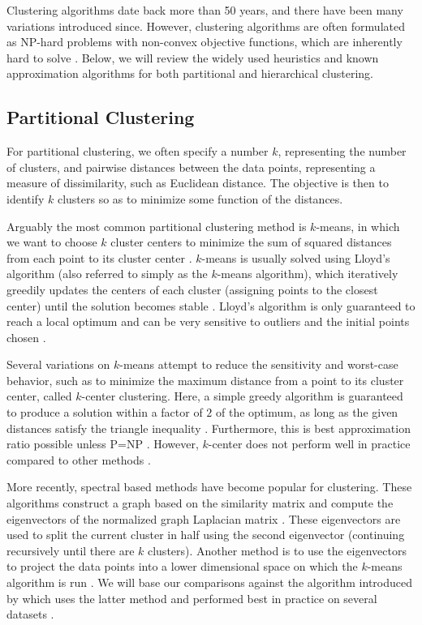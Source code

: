 \documentclass{article}
\begin{document}
Clustering algorithms date back more than 50 years, and there have been many variations introduced since\cite{Jain}. However, clustering algorithms are often formulated as NP-hard problems with non-convex objective functions, which are inherently hard to solve \cite{Jain}.  Below, we will review the widely used heuristics and known approximation algorithms for both partitional and hierarchical clustering.

\subsection{Partitional Clustering}

For partitional clustering, we often specify a number $k$, representing the number of clusters, and pairwise distances between the data points, representing a measure of dissimilarity, such as Euclidean distance.  The objective is then to identify $k$ clusters so as to minimize some function of the distances. 

Arguably the most common partitional clustering method is $k$-means, in which we want to choose $k$ cluster centers to minimize the sum of squared distances from each point to its cluster center \cite{Jain}.  $k$-means is usually solved using Lloyd's algorithm (also referred to simply as the $k$-means algorithm), which iteratively greedily updates the centers of each cluster (assigning points to the closest center) until the solution becomes stable \cite{Jain}. Lloyd's algorithm is only guaranteed to reach a local optimum and can be very sensitive to outliers and the initial points chosen \cite{Kanungo}.

Several variations on $k$-means attempt to reduce the sensitivity and worst-case behavior, such as to minimize the maximum distance from a point to its cluster center, called $k$-center clustering. Here, a simple greedy algorithm is guaranteed to produce a solution within a factor of $2$ of the optimum, as long as the given distances satisfy the triangle inequality \cite{Gonzalez}. Furthermore, this is best approximation ratio possible unless P=NP \cite{Shmoys}.  However, $k$-center does not perform well in practice compared to other methods \cite{Murphy}.

More recently, spectral based methods have become popular for clustering. These algorithms construct a graph based on the similarity matrix and compute the eigenvectors of the normalized graph Laplacian matrix \cite{Luxburg}. These eigenvectors are used to split the current cluster in half using the second eigenvector (continuing recursively until there are $k$ clusters).  Another method is to use the eigenvectors to project the data points into a lower dimensional space on which the $k$-means algorithm is run \cite{Verma}. We will base our comparisons against the algorithm introduced by \cite{Meila} which uses the latter method and performed best in practice on several datasets \cite{Verma}.
\end{document}

